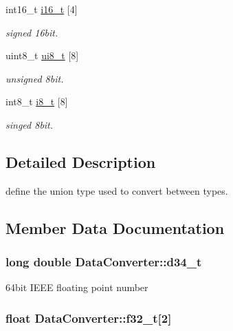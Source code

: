 \begin{DoxyCompactItemize}
int16\-\_\-t \hyperlink{union_data_converter_ad566a31830c516b559b9a3758ad39d82}{i16\-\_\-t} \mbox{[}4\mbox{]}
\begin{DoxyCompactList}\small\item\em signed 16bit. \end{DoxyCompactList}\item 
uint8\-\_\-t \hyperlink{union_data_converter_a6576e61c59bc9d4e1b54f881fe5acdd4}{ui8\-\_\-t} \mbox{[}8\mbox{]}
\begin{DoxyCompactList}\small\item\em unsigned 8bit. \end{DoxyCompactList}\item 
int8\-\_\-t \hyperlink{union_data_converter_a0b79bc0f32d5bc76317f226dfc1a0325}{i8\-\_\-t} \mbox{[}8\mbox{]}
\begin{DoxyCompactList}\small\item\em singed 8bit. \end{DoxyCompactList}\end{DoxyCompactItemize}


\subsection{Detailed Description}
define the union type used to convert between types. 

\subsection{Member Data Documentation}
\hypertarget{union_data_converter_ae9dce194bf800c0ea89942da406dc525}{
\subsubsection[{d34\-\_\-t}]{\setlength{\rightskip}{0pt plus 5cm}long double Data\-Converter\-::d34\-\_\-t}}\label{union_data_converter_ae9dce194bf800c0ea89942da406dc525}


64bit I\-E\-E\-E floating point number 

\hypertarget{union_data_converter_ac99b9f7c8af24916e3b7993c1928b4f2}{
\subsubsection[{f32\-\_\-t}]{\setlength{\rightskip}{0pt plus 5cm}float Data\-Converter\-::f32\-\_\-t\mbox{[}2\mbox{]}}}\label{union_data_converter_ac99b9f7c8af24916e3b7993c1928b4f2}


